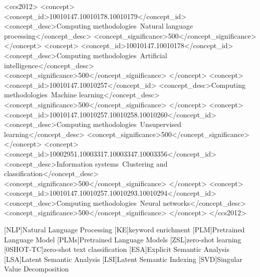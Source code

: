 \documentclass[sigconf]{acmart}
\begin{document}
\begin{CCSXML}
<ccs2012>
   <concept>
       <concept_id>10010147.10010178.10010179</concept_id>
       <concept_desc>Computing methodologies~Natural language processing</concept_desc>
       <concept_significance>500</concept_significance>
       </concept>
   <concept>
       <concept_id>10010147.10010178</concept_id>
       <concept_desc>Computing methodologies~Artificial intelligence</concept_desc>
       <concept_significance>500</concept_significance>
       </concept>
   <concept>
       <concept_id>10010147.10010257</concept_id>
       <concept_desc>Computing methodologies~Machine learning</concept_desc>
       <concept_significance>500</concept_significance>
       </concept>
   <concept>
       <concept_id>10010147.10010257.10010258.10010260</concept_id>
       <concept_desc>Computing methodologies~Unsupervised learning</concept_desc>
       <concept_significance>500</concept_significance>
       </concept>
   <concept>
       <concept_id>10002951.10003317.10003347.10003356</concept_id>
       <concept_desc>Information systems~Clustering and classification</concept_desc>
       <concept_significance>500</concept_significance>
       </concept>
   <concept>
       <concept_id>10010147.10010257.10010293.10010294</concept_id>
       <concept_desc>Computing methodologies~Neural networks</concept_desc>
       <concept_significance>500</concept_significance>
       </concept>
 </ccs2012>
\end{CCSXML}





\maketitle

\begin{acronym}
[NLP]{Natural Language Processing}
[KE]{keyword enrichment}
[PLM]{Pretrained Language Model}
[PLMs]{Pretrained Language Models}
[ZSL]{zero-shot learning}
[0SHOT-TC]{zero-shot text classification}
[ESA]{Explicit Semantic Analysis}
[LSA]{Latent Semantic Analysis}
[LSI]{Latent Semantic Indexing}
[SVD]{Singular Value Decomposition}
\end{acronym}
\end{document}
